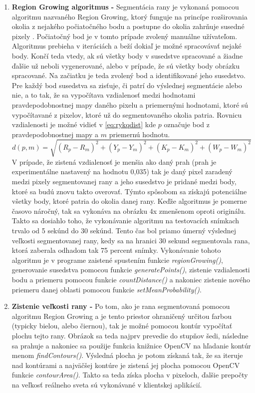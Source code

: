 \begin{enumerate}
    \item \textbf{Region Growing algoritmus -} Segmentácia rany je vykonaná pomocou algoritmu nazvaného Region Growing, ktorý funguje na princípe rozširovania okolia z nejakého počiatočného bodu a postupne do okolia zahrňuje susedné pixely \cite{AHMADFAUZI201574}. Počiatočný bod je v tomto prípade zvolený manuálne užívateľom. Algoritmus prebieha v iteráciách a beží dokiaľ je možné spracovávať nejaké body. Končí teda vtedy, ak sú všetky body v susedstve spracované a žiadne ďalšie už neboli vygenerované, alebo v prípade, že sú všetky body obrázku spracované. Na začiatku je teda zvolený bod a identifikované jeho susedstvo. Pre každý bod susedstva sa zisťuje, či patrí do výslednej segmentácie alebo nie, a to tak, že sa vypočítava vzdialenosť medzi hodnotami pravdepodobnostnej mapy daného pixelu a priemernými hodnotami, ktoré sú vypočítavané z pixelov, ktoré už do segmentovaného okolia patria. Rovnicu vzdialenosti je možné vidieť v \ref{eq:rykqdist} kde $p$ označuje bod z pravdepodobnostnej mapy a $m$ priemernú hodnotu. 
    \begin{equation}
    \label{eq:rykqdist}
    d(p, m) = \sqrt{{(R_{p} - R_{m})}^2 + {(Y_{p} - Y_{m})}^2 + {(K_{p} - K_{m})}^2 + {(W_{p} - W_{m})}^2}
    \end{equation}
    V prípade, že zistená vzdialenosť je menšia ako daný prah (prah je experimentálne nastavený na hodnotu 0,035) tak je daný pixel zaradený medzi pixely segmentovanej rany a jeho susedstvo je pridané medzi body, ktoré sa budú znovu takto overovať. Týmto spôsobom sa získajú potenciálne všetky body, ktoré patria do okolia danej rany. Keďže algoritmus je pomerne časovo náročný, tak sa vykonáva na obrázku 4x zmenšenom oproti originálu. Takto sa dosiahlo toho, že vykonávanie algoritmu na testovacích snímkach trvalo od 5 sekúnd do 30 sekúnd. Tento čas bol priamo úmerný výslednej veľkosti segmentovanej rany, kedy sa na hranici 30 sekund segmentovala rana, ktorá zaberala odhadom tak 75 percent snímky. Vykonávanie tohoto algoritmu je v programe zaistené spustením funkcie \textit{regionGrowing()}, generovanie susedstva pomocou funkcie \textit{generatePoints()}, zistenie vzdialenosti bodu a priemeru pomocou funkcie \textit{countDistance()} a nakoniec zistenie nového priemeru danej oblasti pomocou funkcie \textit{setMeanProbability()}.
    
    \item \textbf{Zistenie veľkosti rany -} Po tom, ako je rana segmentovaná pomocou algoritmu Region Growing a  je tento priestor ohraničený určitou farbou (typicky bielou, alebo čiernou), tak je možné pomocou kontúr vypočítať plochu tejto rany. Obrázok sa teda najprv prevedie do stupňov šedi, následne sa prahuje a nakoniec sa použije funkcia knižnice OpenCV na hľadanie kontúr menom \textit{findContours()}. Výsledná plocha je potom získaná tak, že sa iteruje nad kontúrami a najväčšej kontúre je zistená jej plocha pomocou OpenCV funkcie \textit{contourArea()}. Takto sa teda získa plocha v pixeloch, ďalšie prepočty na veľkosť reálneho sveta sú vykonávané v klientskej aplikácií. 
\end{enumerate}

